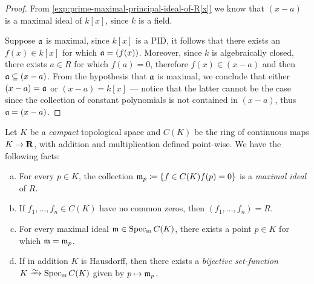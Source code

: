 \begin{proof}
    From \cref{exp:prime-maximal-principal-ideal-of-R[x]} we know that \((x - a)\)
    is a maximal ideal of \(k[x]\), since \(k\) is a field.

    Suppose \(\mathfrak{a}\) is maximal, since \(k[x]\) is a PID, it follows that there
    exists an \(f(x) \in k[x]\) for which \(\mathfrak{a} = (f(x))\). Moreover, since
    \(k\) is algebraically closed, there exists \(a \in R\) for which \(f(a) = 0\),
    therefore \(f(x) \in (x - a)\) and then \(\mathfrak{a} \subseteq (x - a)\). From
    the hypothesis that \(\mathfrak{a}\) is maximal, we conclude that either
    \((x - a) = \mathfrak{a}\) or \((x - a) = k[x]\) --- notice that the latter cannot
    be the case since the collection of constant polynomials is not contained in
    \((x - a)\), thus \(\mathfrak{a} = (x - a)\).
\end{proof}

\begin{example}
    \label{exp:bijection-compact-specm}
    Let \(K\) be a \emph{compact} topological space and \(C(K)\) be the ring of
    continuous maps \(K \to \mathbf{R}\), with addition and multiplication defined
    point-wise. We have the following facts:
    \begin{enumerate}[(a)]\setlength\itemsep{0em}
        \item For every \(p \in K\), the collection
              \(\mathfrak{m}_p \coloneq \{f \in C(K) \relax f(p) = 0\}\) is a \emph{maximal
                  ideal} of \(R\).

        \item If \(f_1, \dots, f_n \in C(K)\) have no common zeros, then
              \((f_1, \dots, f_n) = R\).

        \item For every maximal ideal \(\mathfrak{m} \in \operatorname{Spec_m} C(K)\), there exists a
              point \(p \in K\) for which \(\mathfrak{m} = \mathfrak{m}_p\).

        \item If in addition \(K\) is Hausdorff, then there exists a \emph{bijective
                  set-function} \(K \isoto \Specm C(K)\) given by \(p \mapsto \mathfrak{m}_p\).
    \end{enumerate}
\end{example}

